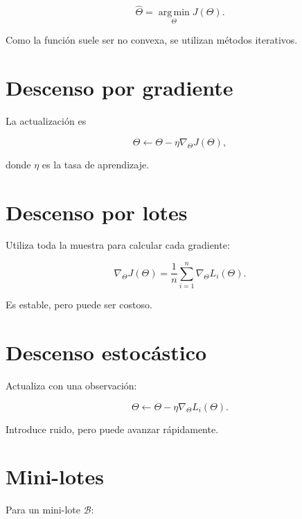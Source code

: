 \documentclass[
  spanish,
  10.5pt,
  letterpaper,
  DIV=11,
  numbers=noendperiod,
  oneside,
  open=any]{scrreprt}
\theoremstyle{definition}
\theoremstyle{definition}
\theoremstyle{plain}
\theoremstyle{remark}
\begin{document}
\[
\widehat{\Theta}
=
\operatorname*{arg\,min}_{\Theta}
J(\Theta).
\]

Como la función suele ser no convexa, se utilizan métodos iterativos.

\section*{Descenso por gradiente}\label{descenso-por-gradiente-1}


La actualización es

\[
\Theta
\leftarrow
\Theta
-
\eta
\nabla_{\Theta}J(\Theta),
\]

donde \(\eta\) es la tasa de aprendizaje.

\section*{Descenso por lotes}\label{descenso-por-lotes}


Utiliza toda la muestra para calcular cada gradiente:

\[
\nabla_{\Theta}J(\Theta)
=
\frac{1}{n}
\sum_{i=1}^{n}
\nabla_{\Theta}
L_i(\Theta).
\]

Es estable, pero puede ser costoso.

\section*{Descenso estocástico}\label{descenso-estocuxe1stico}


Actualiza con una observación:

\[
\Theta
\leftarrow
\Theta
-
\eta
\nabla_{\Theta}
L_i(\Theta).
\]

Introduce ruido, pero puede avanzar rápidamente.

\section*{Mini-lotes}\label{mini-lotes-1}


Para un mini-lote \(\mathcal{B}\):
\end{document}
